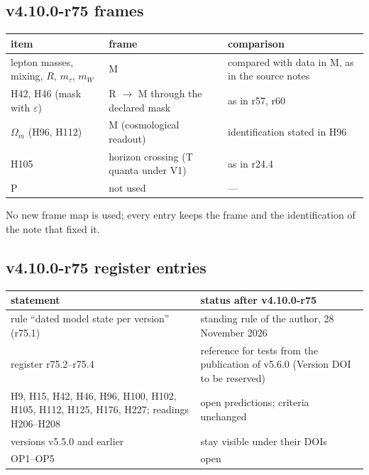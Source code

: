 \subsection*{v4.10.0-r75 frames}
\label{subsec:v4100-r75-frames}

\begin{center}
\small
\begin{tabular}{@{}>{\raggedright\arraybackslash}p{}>{\raggedright\arraybackslash}p{}>{\raggedright\arraybackslash}p{}@{}}
\toprule
item & frame & comparison\\
\midrule
lepton masses, mixing, \(R\), \(m_\tau\), \(m_W\) & M & compared with data in M, as in the source notes\\
H42, H46 (mask with \(\varepsilon\)) & R \(\to\) M through the declared mask & as in r57, r60\\
\(\Omega_m\) (H96, H112) & M (cosmological readout) & identification stated in H96\\
H105 & horizon crossing (T quanta under V1) & as in r24.4\\
P & not used & ---\\
\bottomrule
\end{tabular}
\end{center}
No new frame map is used; every entry keeps the frame and the identification of the note that fixed it.

\subsection*{v4.10.0-r75 register entries}
\label{subsec:v4100-r75-register}

\begin{center}
\small
\begin{tabular}{@{}>{\raggedright\arraybackslash}p{}>{\raggedright\arraybackslash}p{}@{}}
\toprule
statement & status after v4.10.0-r75\\
\midrule
rule ``dated model state per version'' (r75.1) & standing rule of the author, 28 November 2026\\
register r75.2--r75.4 & reference for tests from the publication of v5.6.0 (Version DOI to be reserved)\\
H9, H15, H42, H46, H96, H100, H102, H105, H112, H125, H176, H227; readings H206--H208 & open predictions; criteria unchanged\\
versions v5.5.0 and earlier & stay visible under their DOIs\\
OP1--OP5 & open\\
\bottomrule
\end{tabular}
\end{center}

